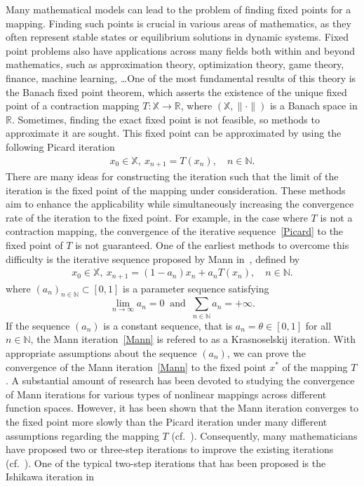 \documentclass[a4paper, 11pt]{article}
\begin{document}
Many mathematical models can lead to the problem of finding fixed points for a mapping. Finding such points is crucial in various areas of mathematics, as they often represent stable states or equilibrium solutions in dynamic systems. Fixed point problems also have applications across many fields both within and beyond mathematics, such as approximation theory, optimization theory, game theory, finance, machine learning, \dots One of the most fundamental results of this theory is the Banach  fixed point theorem, which asserts the existence of the unique fixed point of a contraction mapping $T:\mathbb{X}\to\mathbb R$, where $(\mathbb X,\lVert\cdot\rVert)$ is a Banach space in $\mathbb R$. Sometimes, finding the exact fixed point is not feasible, so methods to approximate it are sought. This fixed point can be approximated by using the following Picard iteration
  \begin{align*}\label{Picard}
          x_0\in \mathbb X, \ 
        x_{n+1}=T(x_n), \quad n\in \mathbb N.\tag{1.1}
     \end{align*}
    There are many ideas for constructing the iteration such that the limit of the iteration is the fixed point of the mapping under consideration. These methods aim to enhance the applicability while simultaneously increasing the convergence rate of the iteration to the fixed point. For example, in the case where $T$ is not a contraction mapping, the convergence of the iterative sequence~\eqref{Picard} to the fixed point of $T$ is not guaranteed. One of the earliest methods to overcome this difficulty is the iterative sequence proposed by Mann in~\cite{Mann}, defined by
    \begin{align*}\label{Mann}
            x_0\in \mathbb X,\
            x_{n+1}=(1-a_n)x_n+a_nT(x_n),\quad n\in \mathbb N.\tag{1.2}
         \end{align*}
    where $(a_n)_{n \in \mathbb{N}}\subset [0,1]$ is a  parameter sequence satisfying 
    $$\lim\limits_{n\to\infty} a_n=0 \ \mbox{ and } \ \displaystyle\sum\limits_{n \in \mathbb{N}}{a_n}=+\infty.$$ 
    If the sequence $(a_n)$ is a constant sequence, that is $a_n = \theta \in [0, 1]$ for all $n \in \mathbb N$, the Mann iteration~\eqref{Mann} is refered to as a Krasnoselskij iteration. With appropriate assumptions about the sequence $(a_n)$, we can prove the convergence of the Mann iteration~\eqref{Mann} to the fixed point $x^*$ of the mapping $T$.  A substantial amount of research has been devoted to studying the convergence of Mann iterations for various types of nonlinear mappings across different function spaces. However, it has been shown that the Mann iteration converges to the fixed point more slowly than the Picard iteration under many different assumptions regarding the mapping $T$ (cf.~\cite{Popescu2007}). Consequently, many mathematicians have proposed two or three-step iterations to improve the existing iterations (cf.~\cite{D70, Halpern, Ishikawa, KX2005}). One of the typical two-step iterations that has been proposed is the Ishikawa iteration in~\cite{Ishikawa}
\end{document}
